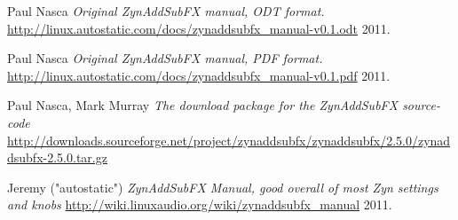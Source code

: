 \begin{thebibliography}{99}
   Paul Nasca
   \emph{Original ZynAddSubFX manual, ODT format.}
   \url{http://linux.autostatic.com/docs/zynaddsubfx\_manual-v0.1.odt}
   2011.

   Paul Nasca
   \emph{Original ZynAddSubFX manual, PDF format.}
   \url{http://linux.autostatic.com/docs/zynaddsubfx\_manual-v0.1.pdf}
   2011.

   Paul Nasca, Mark Murray
   \emph{The download package for the ZynAddSubFX source-code}
   \url{http://downloads.sourceforge.net/project/zynaddsubfx/zynaddsubfx/2.5.0/zynaddsubfx-2.5.0.tar.gz}

   Jeremy ("autostatic")
   \emph{ZynAddSubFX Manual, good overall of most Zyn settings and knobs}
   \url{http://wiki.linuxaudio.org/wiki/zynaddsubfx_manual}
   2011.

\end{thebibliography}


